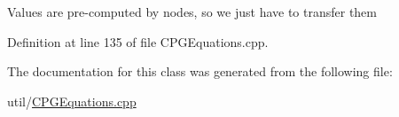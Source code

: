 Values are pre-\/computed by nodes, so we just have to transfer them

Definition at line 135 of file C\-P\-G\-Equations.\-cpp.



The documentation for this class was generated from the following file\-:\begin{DoxyCompactItemize}
\item 
util/\hyperlink{_c_p_g_equations_8cpp}{C\-P\-G\-Equations.\-cpp}\end{DoxyCompactItemize}
